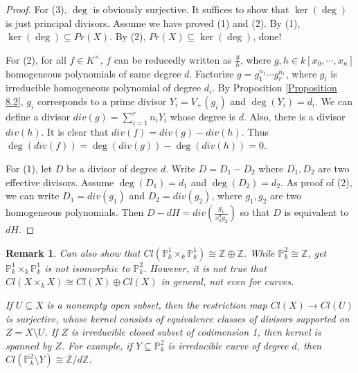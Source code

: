 \documentclass{ctexart}
\newtheorem{remark}{Remark}[section]
\begin{document}
\begin{proof}
    For (3), $\deg$ is obviously surjective.
    It suffices to show that $\ker(\deg)$ is just principal divisors.
    Assume we have proved (1) and (2).
    By (1), $\ker(\deg) \subseteq Pr(X)$.
    By (2), $Pr(X) \subseteq \ker(\deg)$, done!
    \par
    For (2), for all $f\in K^{\times}$, $f$ can be reducedly written as $\frac{g}{h}$, where $g,h\in k[x_{0}, \cdots, x_{n}]$ homogeneous polynomials of same degree $d$.
    Factorize $g = g_{1}^{n_{1}}\cdots g_{r}^{n_{r}}$, where $g_{i}$ is irreducible homogeneous polynomial of degree $d_{i}$.
    By Proposition \ref{Proposition 8.2}, $g_{i}$ corresponds to a prime divisor $Y_{i} = V_{+}(g_{i})$ and $\deg(Y_{i}) = d_{i}$.
    We can define a divisor $div(g) = \sum_{i = 1}^{r} n_{i}Y_{i}$ whose degree is $d$.
    Also, there is a divisor $div(h)$.
    It is clear that $div(f) = div(g) - div(h)$.
    Thus $\deg(div(f)) = \deg(div(g)) - \deg(div(h)) = 0$.
    \par
    For (1), let $D$ be a divisor of degree $d$.
    Write $D = D_{1} - D_{2}$ where $D_{1}, D_{2}$ are two effective divisors.
    Assume $\deg(D_{1}) = d_{1}$ and $\deg(D_{2}) = d_{2}$.
    As proof of (2), we can write $D_{1} = div(g_{1})$ and $D_{2} = div(g_{2})$, where $g_{1}, g_{2}$ are two homogeneous polynomials.
    Then $D - dH = div(\frac{g_{1}}{x_{0}^{d}g_{2}})$ so that $D$ is equivalent to $dH$.
\end{proof}
\begin{remark}
    Can also show that $Cl(\mathbb{P}_{k}^{1} \times_{k} \mathbb{P}_{k}^{1}) \cong \mathbb{Z} \oplus \mathbb{Z}$.
    While $\mathbb{P}_{k}^{2} \cong \mathbb{Z}$, get $\mathbb{P}_{k}^{1} \times_{k} \mathbb{P}_{k}^{1}$ is not isomorphic to $\mathbb{P}_{k}^{2}$.
    However, it is not true that $Cl(X \times_{k} X) \cong Cl(X) \oplus Cl(X)$ in general, not even for curves.
    \par
    If $U \subseteq X$ is a nonempty open subset, then the restriction map $Cl(X) \longrightarrow Cl(U)$ is surjective,
    whose kernel consists of equivalence classes of divisors supported on $Z = X \setminus U$.
    If $Z$ is irreducible closed subset of codimension 1, then kernel is spanned by $Z$.
    For example, if $Y \subseteq \mathbb{P}_{k}^{2}$ is irreducible curve of degree $d$, 
    then $Cl(\mathbb{P}_{k}^{2} \setminus Y) \cong \mathbb{Z}/d\mathbb{Z}$.
\end{remark}
\end{document}
